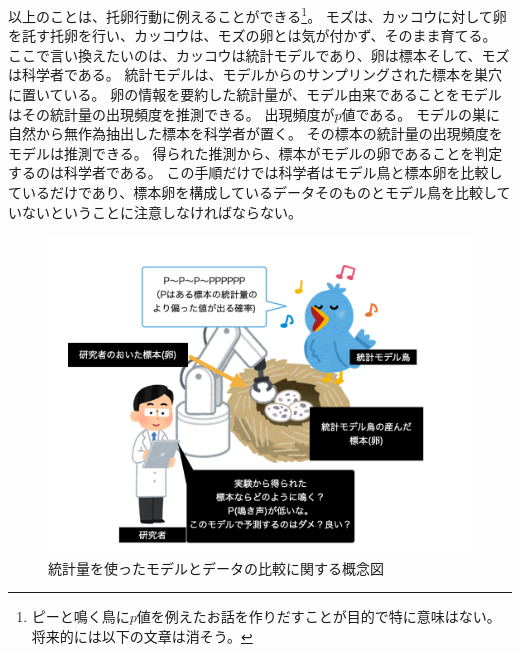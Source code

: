 

以上のことは、托卵行動に例えることができる\footnote{ピーと鳴く鳥に$p$値を例えたお話を作りだすことが目的で特に意味はない。将来的には以下の文章は消そう。}。
モズは、カッコウに対して卵を託す托卵を行い、カッコウは、モズの卵とは気が付かず、そのまま育てる。
ここで言い換えたいのは、カッコウは統計モデルであり、卵は標本そして、モズは科学者である。
統計モデルは、モデルからのサンプリングされた標本を巣穴に置いている。
卵の情報を要約した統計量が、モデル由来であることをモデルはその統計量の出現頻度を推測できる。
出現頻度が$p$値である。
モデルの巣に自然から無作為抽出した標本を科学者が置く。
その標本の統計量の出現頻度をモデルは推測できる。
得られた推測から、標本がモデルの卵であることを判定するのは科学者である。
この手順だけでは科学者はモデル鳥と標本卵を比較しているだけであり、標本卵を構成しているデータそのものとモデル鳥を比較していないということに注意しなければならない。


\begin{figure}
    \begin{center}
        \includegraphics[bb=0 0 1024 768,width=15cm]{./image/01_/conceptual_diagram/conceptual_diagram.003.png}
        \caption{統計量を使ったモデルとデータの比較に関する概念図}
        \label{fig:conceptual_diagram_test}
    \end{center}
\end{figure}



